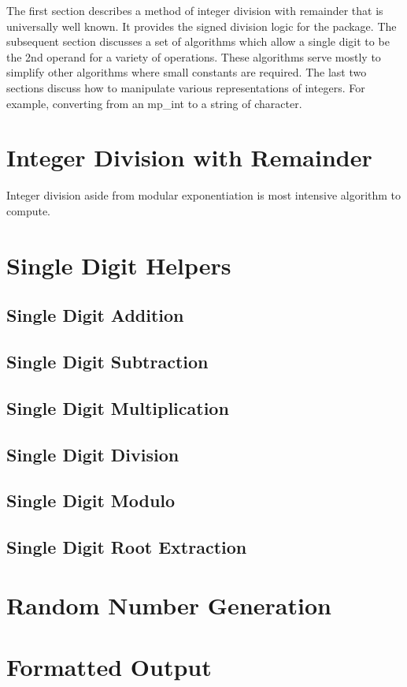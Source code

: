 \documentclass[b5paper]{book}
\begin{document}
The first section describes a method of integer division with remainder that is universally well known.  It provides the signed division logic
for the package.  The subsequent section discusses a set of algorithms which allow a single digit to be the 2nd operand for a variety of operations.  
These algorithms serve mostly to simplify other algorithms where small constants are required.  The last two sections discuss how to manipulate 
various representations of integers.  For example, converting from an mp\_int to a string of character.

\section{Integer Division with Remainder}

Integer division aside from modular exponentiation is most intensive algorithm to compute.  


\section{Single Digit Helpers}
\subsection{Single Digit Addition}
\subsection{Single Digit Subtraction}
\subsection{Single Digit Multiplication}
\subsection{Single Digit Division}
\subsection{Single Digit Modulo}
\subsection{Single Digit Root Extraction}
\section{Random Number Generation}
\section{Formatted Output}
\end{document}
